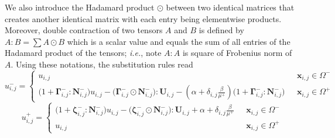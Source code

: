 \documentclass{elsarticle}
\begin{document}
We also introduce the Hadamard product $\odot$ between two identical matrices that creates another identical matrix with each entry being elementwise products. Moreover, double contraction of two tensors $A$ and $B$ is defined by $A : B = \sum A \odot B$ which is a scalar value and equals the sum of all entries of the Hadamard product of the tensors; \textit{i.e.}, note $A:A$ is square of Frobenius norm of $A$. Using these notations, the substitution rules read
\begin{equation}
	u_{i,j}^-=\begin{cases}
		u_{i,j}                                                                                                                                                                                                                                                                        & \text{ $\mathbf{x}_{i,j}\in \Omega^-$} \\
		\big(1 + \boldsymbol{\Gamma}^-_{i,j} : \mathbf{N}^-_{i,j}  \big) u_{i,j} -  \big( \boldsymbol{\Gamma}^-_{i,j}  \odot \mathbf{N}^-_{i,j} \big) : \mathbf{U}_{i,j}  - (\alpha + \delta_{i,j}\frac{\beta}{\mu^+}) \big(1 + \boldsymbol{\Gamma}^-_{i,j} : \mathbf{N}^-_{i,j} \big) & \text{ $\mathbf{x}_{i,j}\in \Omega^+$}
	\end{cases}
\end{equation}
\begin{equation}
	u_{i,j}^+=\begin{cases}
		\big(1 + \boldsymbol{\zeta}^-_{i,j} : \mathbf{N}^-_{i,j}   \big) u_{i,j} - \big( \boldsymbol{\zeta}^-_{i,j}  \odot \mathbf{N}^-_{i,j}  \big) : \mathbf{U}_{i,j} + \alpha + \delta_{i,j}\frac{\beta}{\mu^+} & \text{ $\mathbf{x}_{i,j}\in \Omega^-$} \\
		u_{i,j}                                                                                                                                                                                                    & \text{ $\mathbf{x}_{i,j}\in \Omega^+$}
	\end{cases}
\end{equation}
\end{document}
